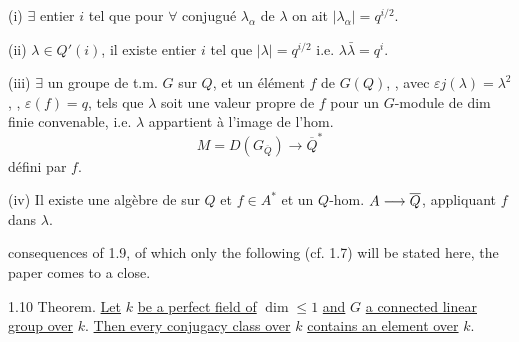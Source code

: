 (i) $\exists$ entier $i$ tel que pour $\forall$ conjugué $\lambda_\alpha$ de $\lambda$ on ait $|\lambda_\alpha|=q^{i/2}$.


(ii) $\lambda\in Q'(i)$, il existe entier $i$ tel que $|\lambda|=q^{i/2}$ i.e. $\lambda\bar\lambda=q^i$.

(iii) $\exists$ un groupe de t.m. $G$ sur $Q$, et un élément $f$ de $G(Q)$,
,
avec $\varepsilon j(\lambda)=\lambda^2$,  , $\varepsilon(f)=q$, tels que $\lambda$ soit une valeur propre de $f$ pour un $G$-module de dim finie  convenable, i.e. $\lambda$ appartient à l'image de l'hom.
\[
M=D(G_{\overline Q})\longrightarrow\overline Q^*
\]
défini par $f$.

(iv) Il existe une algèbre de   sur $Q$ et $f\in A^*$  et un $Q$-hom. ${A}\longrightarrow\overline Q$, appliquant $f$ dans $\lambda$.




consequences of 1.9, of which only the following (cf. 1.7) will be stated here, the paper comes to a close.

1.10 Theorem. \uline{Let} $k$ \uline{be a perfect field of} $\dim\leq1$ \uline{and} $G$ \uline{a connected linear group over} $k$. \uline{Then every conjugacy class over} $k$ \uline{contains an element over} $k$.

